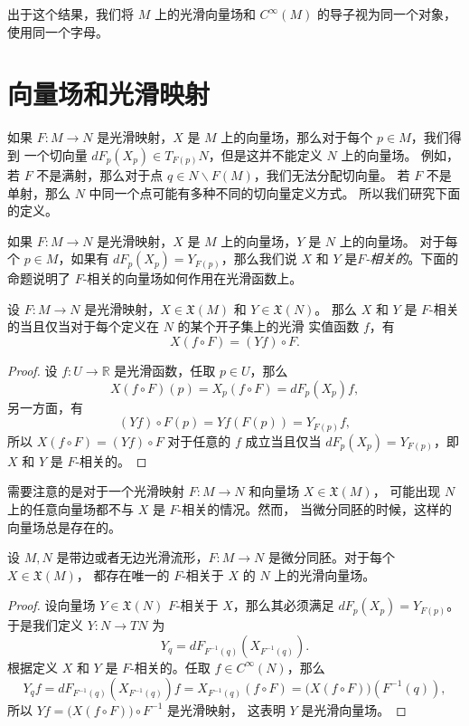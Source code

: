 出于这个结果，我们将 $M$ 上的光滑向量场和 $C^\infty(M)$ 的导子视为同一个对象，
使用同一个字母。

\section{向量场和光滑映射}

如果 $F:M\to N$ 是光滑映射，$X$ 是 $M$ 上的向量场，那么对于每个 $p\in M$，我们得到
一个切向量 $dF_p(X_p)\in T_{F(p)}N$，但是这并不能定义 $N$ 上的向量场。
例如，若 $F$ 不是满射，那么对于点 $q\in N \smallsetminus F(M)$，我们无法分配切向量。
若 $F$ 不是单射，那么 $N$ 中同一个点可能有多种不同的切向量定义方式。
所以我们研究下面的定义。

如果 $F:M\to N$ 是光滑映射，$X$ 是 $M$ 上的向量场，$Y$ 是 $N$ 上的向量场。
对于每个 $p\in M$，如果有 $dF_p(X_p)=Y_{F(p)}$，那么我们说 $X$ 和 $Y$
是\emph{$F$-相关的}。下面的命题说明了 $F$-相关的向量场如何作用在光滑函数上。

\begin{proposition}
  设 $F:M\to N$ 是光滑映射，$X\in \mathfrak X(M)$ 和 $Y\in \mathfrak X(N)$。
  那么 $X$ 和 $Y$ 是 $F$-相关的当且仅当对于每个定义在 $N$ 的某个开子集上的光滑
  实值函数 $f$，有
  \[
    X(f\circ F)=(Yf)\circ F.
  \]
\end{proposition}
\begin{proof}
  设 $f:U\to \mathbb{R}$ 是光滑函数，任取 $p\in U$，那么
  \[
    X(f\circ F)(p)=X_p(f\circ F)=dF_p(X_p)f,
  \]
  另一方面，有
  \[
    (Yf)\circ F(p)=Yf(F(p))=Y_{F(p)}f,
  \]
  所以 $X(f\circ F)=(Yf)\circ F$ 对于任意的 $f$ 成立当且仅当
  $dF_p(X_p)=Y_{F(p)}$，即 $X$ 和 $Y$ 是 $F$-相关的。
\end{proof}

需要注意的是对于一个光滑映射 $F:M\to N$ 和向量场 $X\in \mathfrak X(M)$，
可能出现 $N$ 上的任意向量场都不与 $X$ 是 $F$-相关的情况。然而， 
当微分同胚的时候，这样的向量场总是存在的。

\begin{proposition}
  设 $M,N$ 是带边或者无边光滑流形，$F:M\to N$ 是微分同胚。对于每个 $X\in \mathfrak X(M)$，
  都存在唯一的 $F$-相关于 $X$ 的 $N$ 上的光滑向量场。
\end{proposition}
\begin{proof}
  设向量场 $Y\in \mathfrak X(N)$ $F$-相关于 $X$，那么其必须满足 $dF_p(X_p)=Y_{F(p)}$。
  于是我们定义 $Y:N\to TN$ 为
  \[
    Y_q=dF_{F^{-1}(q)}\left(X_{F^{-1}(q)}\right).
  \]
  根据定义 $X$ 和 $Y$ 是 $F$-相关的。任取 $f\in C^\infty(N)$，那么
  \[
    Y_qf=dF_{F^{-1}(q)}\left(X_{F^{-1}(q)}\right)f=
    X_{F^{-1}(q)}(f\circ F)=\bigl(X(f\circ F)\bigr)(F^{-1}(q)),
  \]
  所以 $Yf=\bigl(X(f\circ F)\bigr)\circ F^{-1}$ 是光滑映射，
  这表明 $Y$ 是光滑向量场。
\end{proof}

